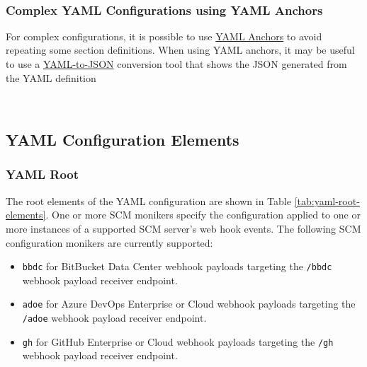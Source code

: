 

\newpage
\noindent\\


\subsubsection{Complex YAML Configurations using YAML Anchors}

For complex configurations, it is possible to use 
\href{https://docs.docker.com/compose/compose-file/10-fragments/}{YAML Anchors}
to avoid repeating some section definitions.  When using YAML anchors, it may be useful
to use a \href{https://onlineyamltools.com/convert-yaml-to-json}{YAML-to-JSON} conversion tool that shows the JSON generated from the YAML
definition

\noindent\\

\subsection{YAML Configuration Elements}

\subsubsection{YAML Root}\label{sec:yaml-root}

The root elements of the YAML configuration are shown in Table \ref{tab:yaml-root-elements}.
One or more SCM monikers specify the configuration applied to one
or more instances of a supported SCM server's web hook events.  
The following SCM configuration monikers are currently supported:

\begin{itemize}
    \item \texttt{bbdc} for BitBucket Data Center webhook payloads targeting the \texttt{/bbdc}
    webhook payload receiver endpoint.
    \item \texttt{adoe} for Azure DevOps Enterprise or Cloud webhook payloads targeting the \texttt{/adoe}
    webhook payload receiver endpoint.
    \item \texttt{gh} for GitHub Enterprise or Cloud webhook payloads targeting the \texttt{/gh}
    webhook payload receiver endpoint.
\end{itemize}


